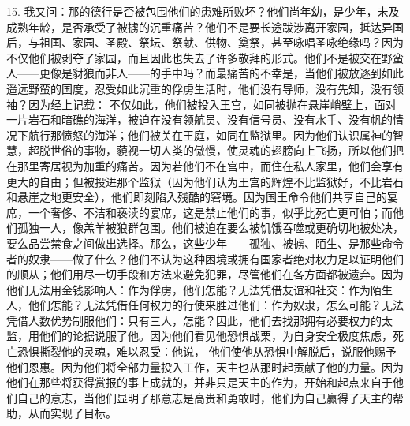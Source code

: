 15. 我又问：那的德行是否被包围他们的患难所败坏？他们尚年幼，是少年，未及成熟年龄，是否承受了被掳的沉重痛苦？他们不是要长途跋涉离开家园，抵达异国后，与祖国、家园、圣殿、祭坛、祭献、供物、奠祭，甚至咏唱圣咏绝缘吗？因为不仅他们被剥夺了家园，而且因此也失去了许多敬拜的形式。他们不是被交在野蛮人——更像是豺狼而非人——的手中吗？而最痛苦的不幸是，当他们被放逐到如此遥远野蛮的国度，忍受如此沉重的俘虏生活时，他们没有导师，没有先知，没有领袖？因为经上记载： 不仅如此，他们被投入王宫，如同被抛在悬崖峭壁上，面对一片岩石和暗礁的海洋，被迫在没有领航员、没有信号员、没有水手、没有帆的情况下航行那愤怒的海洋；他们被关在王庭，如同在监狱里。因为他们认识属神的智慧，超脱世俗的事物，藐视一切人类的傲慢，使灵魂的翅膀向上飞扬，所以他们把在那里寄居视为加重的痛苦。因为若他们不在宫中，而住在私人家里，他们会享有更大的自由；但被投进那个监狱（因为他们认为王宫的辉煌不比监狱好，不比岩石和悬崖之地更安全），他们即刻陷入残酷的窘境。因为国王命令他们共享自己的宴席，一个奢侈、不洁和亵渎的宴席，这是禁止他们的事，似乎比死亡更可怕；而他们孤独一人，像羔羊被狼群包围。他们被迫在要么被饥饿吞噬或更确切地被处决，要么品尝禁食之间做出选择。那么，这些少年——孤独、被掳、陌生、是那些命令者的奴隶——做了什么？他们不认为这种困境或拥有国家者绝对权力足以证明他们的顺从；他们用尽一切手段和方法来避免犯罪，尽管他们在各方面都被遗弃。因为他们无法用金钱影响人：作为俘虏，他们怎能？无法凭借友谊和社交：作为陌生人，他们怎能？无法凭借任何权力的行使来胜过他们：作为奴隶，怎么可能？无法凭借人数优势制服他们：只有三人，怎能？因此，他们去找那拥有必要权力的太监，用他们的论据说服了他。因为他们看见他恐惧战栗，为自身安全极度焦虑，死亡恐惧撕裂他的灵魂，难以忍受：他说， 他们使他从恐惧中解脱后，说服他赐予他们恩惠。因为他们将全部力量投入工作，天主也从那时起贡献了他的力量。因为他们在那些将获得赏报的事上成就的，并非只是天主的作为，开始和起点来自于他们自己的意志，当他们显明了那意志是高贵和勇敢时，他们为自己赢得了天主的帮助，从而实现了目标。\par

